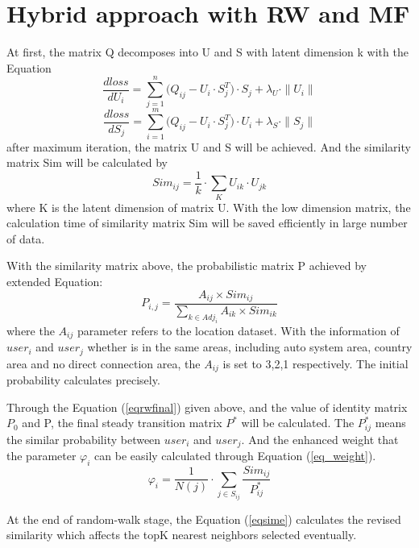 \documentclass[conference]{IEEEtran}
\begin{document}
\section{Hybrid approach with RW and MF}\label{S-HRWMF}
\par At first, the matrix Q decomposes into U and S with latent dimension k with the Equation
\begin{equation}
{\frac{dloss}{dU_{i}}={\sum_{j=1}^{n}{
(Q_{ij}-U_{i} \cdot S_{j}^{T}}) \cdot S_{j}
} 
+ \lambda_{U} \cdot \|U_{i}\|
\label{eq5}
} 
\end{equation}
\begin{equation}
\frac{dloss}{dS_{j}}={\sum_{i=1}^{m}{
(Q_{ij}-U_{i} \cdot S_{j}^{T}}) \cdot U_{i}
}
+ \lambda_{S} \cdot \|S_{j}\|
\label{eq6}
\end{equation}
after maximum iteration, the matrix U and S will be achieved. And the similarity matrix Sim will be calculated by 
\begin{equation}
Sim_{ij}=\frac{1}{k} \cdot  \sum_{K}U_{ik} \cdot U_{jk}
\end{equation}
where K is the latent dimension of matrix U. With the low dimension matrix, the calculation time of similarity matrix Sim will be saved efficiently in large number of data.
\par With the similarity matrix above, the probabilistic matrix P achieved by extended Equation:
\begin{equation}
P_{i,j}=\frac{A_{ij} \times Sim_{ij}}{\sum_{k \in Adj_{i}}{A_{ik} \times Sim_{ik}}}
\end{equation}
where the $A_{ij}$ parameter refers to the location dataset. With the information of $user_{i}$ and $user_{j}$ whether is in the same areas, including auto system area, country area and no direct connection area, the $A_{ij}$ is set to 3,2,1 respectively. The initial probability calculates precisely.
\par Through the Equation (\ref{eqrwfinal}) given above, and the value of identity matrix $P_{0}$ and P, the final steady transition matrix $P^{*}$ will be calculated. The $P^{*}_{ij}$ means the similar probability between $user_{i}$ and $user_{j}$. And the enhanced weight that the parameter $\varphi_{i}$ can be easily calculated through Equation (\ref{eq_weight}).
\begin{equation}
\varphi_{i}=\frac{1}{N(j)} \cdot \sum_{j \in S_{ij}}{\frac{Sim_{ij}}{P^{*}_{ij}}}
\label{eq_weight}
\end{equation}
\par At the end of random-walk stage, the Equation (\ref{eqsime}) calculates the revised similarity which affects the topK nearest neighbors selected\cite{hadad_tqos:_2010} eventually. 
\end{document}
